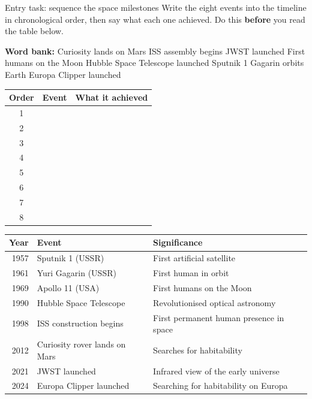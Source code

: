 \documentclass[11pt,a4paper]{article}
\newenvironment{fillin}[1][2.6]{\begingroup\renewcommand{\arraystretch}{#1}}{\endgroup}
\begin{document}
\begin{scaffold}{Entry task: sequence the space milestones}
Write the eight events into the timeline in chronological order, then say what
each one achieved. Do this \textbf{before} you read the table below.

\medskip
\noindent\textbf{Word bank:}\; Curiosity lands on Mars \;\textbullet\; ISS
assembly begins \;\textbullet\; JWST launched \;\textbullet\; First humans on
the Moon \;\textbullet\; Hubble Space Telescope launched \;\textbullet\;
Sputnik 1 \;\textbullet\; Gagarin orbits Earth \;\textbullet\; Europa Clipper
launched

\medskip
\begin{center}
\begin{fillin}[2.2]
\begin{tabular}{|c|p{4.6cm}|p{6.4cm}|}
\hline
\textbf{Order} & \textbf{Event} & \textbf{What it achieved} \\ \hline
1 & & \\ \hline
2 & & \\ \hline
3 & & \\ \hline
4 & & \\ \hline
5 & & \\ \hline
6 & & \\ \hline
7 & & \\ \hline
8 & & \\ \hline
\end{tabular}
\end{fillin}
\end{center}
\end{scaffold}


\begin{center}
\begin{tabular}{rll}
\toprule
\textbf{Year} & \textbf{Event} & \textbf{Significance} \\
\midrule
1957 & Sputnik 1 (USSR) & First artificial satellite \\
1961 & Yuri Gagarin (USSR) & First human in orbit \\
1969 & Apollo 11 (USA) & First humans on the Moon \\
1990 & Hubble Space Telescope & Revolutionised optical astronomy \\
1998 & ISS construction begins & First permanent human presence in space \\
2012 & Curiosity rover lands on Mars & Searches for habitability \\
2021 & JWST launched & Infrared view of the early universe \\
2024 & Europa Clipper launched & Searching for habitability on Europa \\
\bottomrule
\end{tabular}
\end{center}
\end{document}
